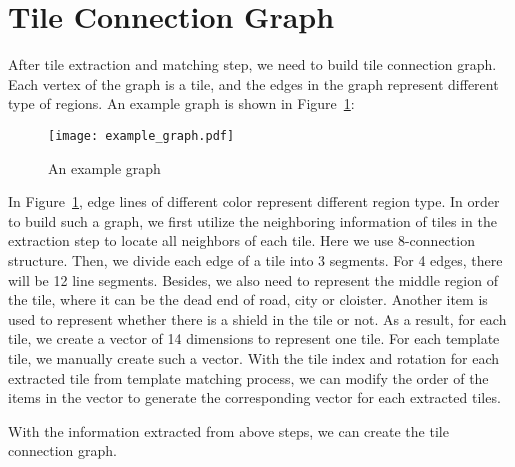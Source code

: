 \section{Tile Connection Graph}
After tile extraction and matching step, we need to build tile connection graph. Each vertex of the graph is a tile, and the edges in the 
graph represent different type of regions. An example graph is shown in Figure~\ref{eg_graph}:

\begin{figure}[htbp]
	  \centering
	  \texttt{[image: example\_graph.pdf]}
	  \caption{An example graph}
	  \label{eg_graph}
\end{figure}

In Figure~\ref{eg_graph}, edge lines of different color represent different region type. In order to build such a graph, we first utilize the 
neighboring information of tiles in the extraction step to locate all neighbors of each tile. Here we use 8-connection structure. Then, we divide each edge of a tile into 3 segments. For 4 edges, there will be 12 line segments. Besides, we also need to represent the middle region 
of the tile, where it can be the dead end of road, city or cloister. Another item is used to represent whether there is a shield in the tile or not. As a 
result, for each tile, we create a vector of 14 dimensions to represent one tile. For each template tile, we manually create such a vector. With the tile index and rotation for each extracted tile from template matching process, we can modify the order of the items in the 
vector to generate the corresponding vector for each extracted tiles.

With the information extracted from above steps, we can create the tile connection graph. 